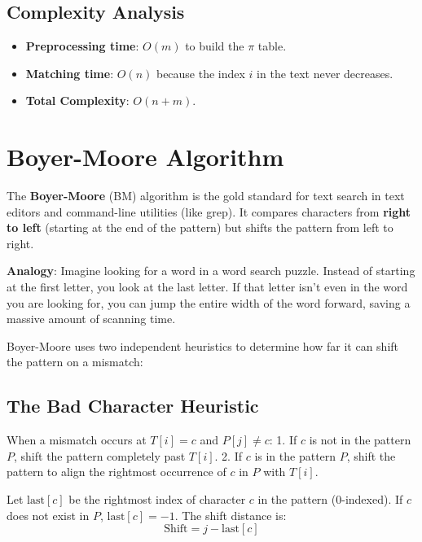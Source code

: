 \documentclass[11pt,a4paper]{article}
\begin{document}
\subsection{Complexity Analysis}
\begin{itemize}
  \item \textbf{Preprocessing time}: $O(m)$ to build the $\pi$ table.
  \item \textbf{Matching time}: $O(n)$ because the index $i$ in the text never decreases.
  \item \textbf{Total Complexity}: $O(n + m)$.
\end{itemize}

\newpage

\section{Boyer-Moore Algorithm}

The \textbf{Boyer-Moore} (BM) algorithm is the gold standard for text search in text editors and command-line utilities (like grep). It compares characters from \textbf{right to left} (starting at the end of the pattern) but shifts the pattern from left to right.

\begin{notebox}
  \textbf{Analogy}:
  Imagine looking for a word in a word search puzzle. Instead of starting at the first letter, you look at the last letter. If that letter isn't even in the word you are looking for, you can jump the entire width of the word forward, saving a massive amount of scanning time.
\end{notebox}

Boyer-Moore uses two independent heuristics to determine how far it can shift the pattern on a mismatch:

\subsection{The Bad Character Heuristic}
When a mismatch occurs at $T[i] = c$ and $P[j] \neq c$:
1. If $c$ is not in the pattern $P$, shift the pattern completely past $T[i]$.
2. If $c$ is in the pattern $P$, shift the pattern to align the rightmost occurrence of $c$ in $P$ with $T[i]$.

Let $\text{last}[c]$ be the rightmost index of character $c$ in the pattern ($0$-indexed). If $c$ does not exist in $P$, $\text{last}[c] = -1$.
The shift distance is:
\begin{equation}
  \text{Shift} = j - \text{last}[c]
\end{equation}
\end{document}
